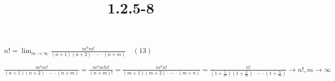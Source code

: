 \documentclass{article}
\title{1.2.5-8}
\begin{document}
\maketitle

\( n! = \lim_{m\to\infty} \frac{m^nm!}{(n+1)(n+2) \cdot\ \cdots\ \cdot (n+m)}\quad (13) \)

\( \frac{m^nm!}{(n+1)(n+2) \cdot\ \cdots\ \cdot (n+m)} = \frac{m^n m! n!}{(n+m)!} = \frac{m^n n!}{(m+1)(m+2) \cdot\ \cdots\ \cdot (m+n)} = \frac{n!}{(1+\frac{1}{m})(1+\frac{2}{m}) \cdot\ \cdots\ \cdot (1+\frac{n}{m})} \to n!, m \to \infty \)
\end{document}
